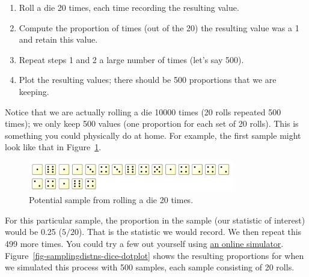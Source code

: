 \documentclass[
  letterpaper,
  DIV=11,
  numbers=noendperiod]{scrreprt}
\providecommand{\tightlist}{%
  \setlength{\itemsep}{0pt}\setlength{\parskip}{0pt}}\usepackage{longtable,booktabs,array}
\theoremstyle{plain}
\theoremstyle{definition}
\theoremstyle{definition}
\theoremstyle{remark}
\begin{document}
\begin{enumerate}
\def\labelenumi{\arabic{enumi}.}
\tightlist
\item
  Roll a die 20 times, each time recording the resulting value.
\item
  Compute the proportion of times (out of the 20) the resulting value
  was a 1 and retain this value.
\item
  Repeat steps 1 and 2 a large number of times (let's say 500).
\item
  Plot the resulting values; there should be 500 proportions that we are
  keeping.
\end{enumerate}

Notice that we are actually rolling a die 10000 times (20 rolls repeated
500 times); we only keep 500 values (one proportion for each set of 20
rolls). This is something you could physically do at home. For example,
the first sample might look like that in
Figure~\ref{fig-samplingdistns-dice-example}.

\begin{figure}

{\centering \includegraphics[width=0.8\textwidth,height=\textheight]{./images/SamplingDistns-Dice-Example.jpg}

}

\caption{\label{fig-samplingdistns-dice-example}Potential sample from
rolling a die 20 times.}

\end{figure}

For this particular sample, the proportion in the sample (our statistic
of interest) would be 0.25 (\(5/20\)). That is the statistic we would
record. We then repeat this 499 more times. You could try a few out
yourself using \href{https://www.random.org/dice/?num=20}{an online
simulator}. Figure~\ref{fig-samplingdistns-dice-dotplot} shows the
resulting proportions for when we simulated this process with 500
samples, each sample consisting of 20 rolls.
\end{document}
